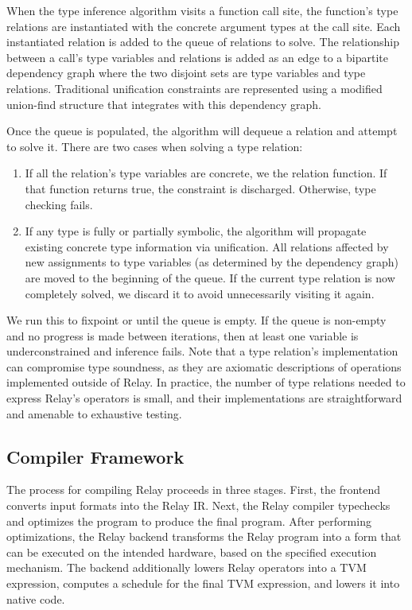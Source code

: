   When the type inference algorithm visits a function call site, the function's type relations are
    instantiated with the concrete argument types at the call site.
  Each instantiated relation is added to the queue of relations to solve.
  The relationship between a call's type variables and relations is added as an edge to
    a bipartite dependency graph where the two disjoint sets are type variables and type relations.
  Traditional unification constraints are represented using a modified union-find structure that
    integrates with this dependency graph.

  Once the queue is populated, the algorithm will dequeue a relation and attempt to solve it.
  There are two cases when solving a type relation:
  \begin{enumerate}
    \item If all the relation's type variables
    are concrete, we the relation function. If that function returns true, the
    constraint is discharged. Otherwise, type checking fails.
    \item If any type is fully or partially symbolic, the
      algorithm will propagate
      existing concrete type information via unification.
    All relations affected by new assignments to type
      variables (as determined by the dependency graph)
      are moved to the beginning of the queue.
    If the current type relation is now completely solved, we
    discard it to avoid unnecessarily visiting it again.
  \end{enumerate}

  We run this to fixpoint or until the queue is empty.
  If the queue is non-empty and no progress is made between iterations,
    then at least one variable is underconstrained and inference fails.
  Note that a type relation's implementation can
    compromise type soundness, as they are axiomatic descriptions
    of operations implemented outside of Relay.
  In practice, the number of type relations needed to express Relay's
    operators is small, and their implementations are straightforward
    and amenable to exhaustive testing.

  \subsection{Compiler Framework}

  The process for compiling Relay proceeds in three stages.
  First, the frontend converts input formats into the Relay IR.
  Next, the Relay compiler typechecks and optimizes the program
    to produce the final program.
  After performing optimizations,
    the Relay backend transforms
    the Relay program into a form that can be executed on
    the intended hardware, based on the specified execution mechanism.
  The backend additionally lowers Relay operators into a TVM expression,
    computes a schedule for the final TVM expression, and lowers it into
    native code.

